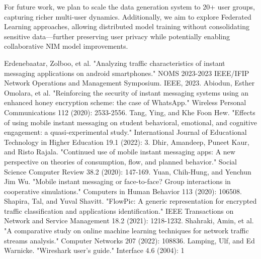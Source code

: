 \documentclass[conference]{IEEEtran}
\begin{document}
For future work, we plan to scale the data generation system to 20+ user groups, capturing richer multi-user dynamics. Additionally, we aim to explore Federated Learning approaches, allowing distributed model training without consolidating sensitive data—further preserving user privacy while potentially enabling collaborative NIM model improvements. 






\begin{thebibliography}{00}
 Erdenebaatar, Zolboo, et al. "Analyzing traffic characteristics of instant messaging applications on android smartphones." NOMS 2023-2023 IEEE/IFIP Network Operations and Management Symposium. IEEE, 2023.
 Abiodun, Esther Omolara, et al. "Reinforcing the security of instant messaging systems using an enhanced honey encryption scheme: the case of WhatsApp." Wireless Personal Communications 112 (2020): 2533-2556.
 Tang, Ying, and Khe Foon Hew. "Effects of using mobile instant messaging on student behavioral, emotional, and cognitive engagement: a quasi-experimental study." International Journal of Educational Technology in Higher Education 19.1 (2022): 3.
 Dhir, Amandeep, Puneet Kaur, and Risto Rajala. "Continued use of mobile instant messaging apps: A new perspective on theories of consumption, flow, and planned behavior." Social Science Computer Review 38.2 (2020): 147-169.
 Yuan, Chih-Hung, and Yenchun Jim Wu. "Mobile instant messaging or face-to-face? Group interactions in cooperative simulations." Computers in Human Behavior 113 (2020): 106508.
 Shapira, Tal, and Yuval Shavitt. "FlowPic: A generic representation for encrypted traffic classification and applications identification." IEEE Transactions on Network and Service Management 18.2 (2021): 1218-1232.
 Shahraki, Amin, et al. "A comparative study on online machine learning techniques for network traffic streams analysis." Computer Networks 207 (2022): 108836.
 Lamping, Ulf, and Ed Warnicke. "Wireshark user's guide." Interface 4.6 (2004): 1

\end{thebibliography}
\end{document}
